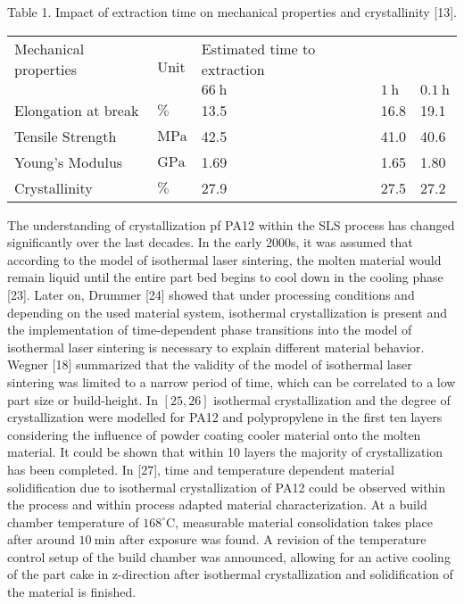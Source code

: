 \documentclass[10pt]{article}
\begin{document}
Table 1. Impact of extraction time on mechanical properties and crystallinity [13].

\begin{center}
\begin{tabular}{l|l|l|l|l}
\hline
Mechanical properties & \multirow{2}{*}{Unit} & Estimated time to extraction &  &  \\
\cline { 3 - 6 }
 &  & $66 \mathrm{~h}$ & $1 \mathrm{~h}$ & $0.1 \mathrm{~h}$ \\
\hline
Elongation at break & $\%$ & 13.5 & 16.8 & 19.1 \\
\hline
Tensile Strength & $\mathrm{MPa}$ & 42.5 & 41.0 & 40.6 \\
\hline
Young's Modulus & $\mathrm{GPa}$ & 1.69 & 1.65 & 1.80 \\
\hline
Crystallinity & $\%$ & 27.9 & 27.5 & 27.2 \\
\hline
\end{tabular}
\end{center}

The understanding of crystallization pf PA12 within the SLS process has changed significantly over the last decades. In the early 2000s, it was assumed that according to the model of isothermal laser sintering, the molten material would remain liquid until the entire part bed begins to cool down in the cooling phase [23]. Later on, Drummer [24] showed that under processing conditions and depending on the used material system, isothermal crystallization is present and the implementation of time-dependent phase transitions into the model of isothermal laser sintering is necessary to explain different material behavior. Wegner [18] summarized that the validity of the model of isothermal laser sintering was limited to a narrow period of time, which can be correlated to a low part size or build-height. In $[25,26]$ isothermal crystallization and the degree of crystallization were modelled for PA12 and polypropylene in the first ten layers considering the influence of powder coating cooler material onto the molten material. It could be shown that within 10 layers the majority of crystallization has been completed. In [27], time and temperature dependent material solidification due to isothermal crystallization of PA12 could be observed within the process and within process adapted material characterization. At a build chamber temperature of $168^{\circ} \mathrm{C}$, measurable material consolidation takes place after around $10 \mathrm{~min}$ after exposure was found. A revision of the temperature control setup of the build chamber was announced, allowing for an active cooling of the part cake in z-direction after isothermal crystallization and solidification of the material is finished.
\end{document}
